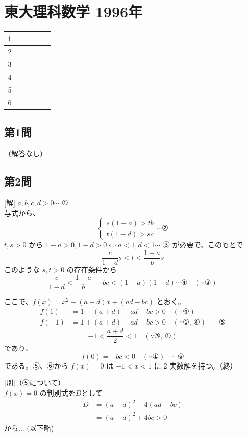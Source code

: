 \documentclass[../main.tex]{subfiles}
\begin{document}
\section*{東大理科数学 1996年}

\begin{center}
  \begin{tabular}{|c|c|c|c|c|c|}
    \hline
    1 & & & & & \\
    \hline
    2 & & & & & \\
    \hline
    3 & & & & & \\
    \hline
    4 & & & & & \\
    \hline
    5 & & & & & \\
    \hline
    6 & & & & & \\
    \hline
  \end{tabular}
\end{center}

\subsection*{第1問}
（解答なし）

\subsection*{第2問}
[解] $a,b,c,d>0 \cdots$ ①\\
与式から、
\[
  \begin{cases} s(1-a) > tb \\ t(1-d) > sc
\end{cases} \cdots \text{②} \]
$t, s > 0$ から $1-a>0, 1-d>0 \iff a<1, d<1 \cdots$ ③ が必要で、このもとで
\[ \frac{c}{1-d} s < t < \frac{1-a}{b} s \]
このような $s, t > 0$ の存在条件から
\[ \frac{c}{1-d} < \frac{1-a}{b} \quad \therefore bc < (1-a)(1-d) \cdots \text{④} \quad (\because \text{③}) \]

ここで、$f(x) = x^2 - (a+d)x + (ad-bc)$ とおく。
\begin{align*}
  f(1) &= 1 - (a+d) + ad - bc > 0 \quad (\because \text{④}) \\
  f(-1) &= 1 + (a+d) + ad - bc > 0 \quad (\because \text{①, ④}) \quad \cdots \text{⑤}
\end{align*}
\[ -1 < \frac{a+d}{2} < 1 \quad (\because \text{③, ①}) \]
であり、
\[ f(0) = -bc < 0 \quad (\because \text{①}) \quad \cdots \text{⑥} \]
である。⑤、⑥から $f(x)=0$ は $-1 < x < 1$ に $2$ 実数解を持つ。（終）

[別]（⑤について）\\
$f(x)=0$ の判別式を$D$として
\begin{align*}
  D &= (a+d)^2 - 4(ad-bc) \\
  &= (a-d)^2 + 4bc > 0
\end{align*}
から... (以下略)
\end{document}
